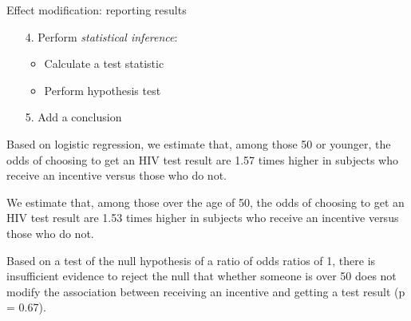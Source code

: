 \documentclass[10pt,t]{beamer}
\begin{document}
\begin{frame}{Effect modification: reporting results}
	\vspace{-5mm}
	
	\begin{enumerate}
		\item[4.] Perform \textit{statistical inference}:
		\begin{itemize}
			\item Calculate a test statistic
			\item Perform hypothesis test
		\end{itemize}
		\item[5.] Add a conclusion
	\end{enumerate}
	
	\medskip
	
	Based on logistic regression, we estimate that, among those 50 or younger, the odds of choosing to get an HIV test result are 1.57 times higher in subjects who receive an incentive versus those who do not. 
	
	\medskip
	
	We estimate that, among those over the age of 50, the odds of choosing to get an HIV test result are 1.53 times higher in subjects who receive an incentive versus those who do not. 
	
	\medskip
	
	Based on a test of the null hypothesis of a ratio of odds ratios of 1, there is insufficient evidence to reject the null that whether someone is over 50 does not modify the association between receiving an incentive and getting a test result (p = 0.67). 
\end{frame}
\end{document}
